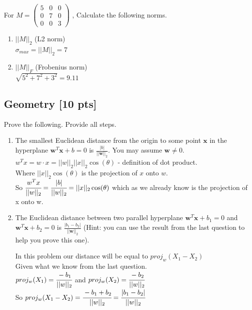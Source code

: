 \documentclass[a4paper]{article}
\theoremstyle{definition}
\newenvironment{soln}{
	\leavevmode\color{blue}\ignorespaces
}{}
\begin{document}
	For $M = \begin{pmatrix}
		5 & 0 & 0 \\ 0 & 7 & 0 \\ 0 & 0 & 3
		
	\end{pmatrix} $ , Calculate the following norms.
	\begin{enumerate}\addtocounter{enumi}{3}
		\item $||M||_{2}$ (L2 norm) \\
		\begin{soln}  $\sigma_{max} = ||M||_{2} = 7$ \end{soln}
		
		\item $||M||_{F}$ (Frobenius norm)\\
		\begin{soln}  $\sqrt{5^{2}+7^{2}+3^{2}}=9.11$ \end{soln}
		
		
	\end{enumerate}
	
	
	
	\subsection{Geometry [10 pts]}
	Prove the following.  Provide all steps.
	\begin{enumerate}
		\item 	The smallest Euclidean distance from the origin to some point $\mathbf{x}$ in the hyperplane $\mathbf{w}^{T}\mathbf{x} + b = 0$ is $\frac{|b|}{||\mathbf{w}||_2}$.  You may assume $\mathbf{w} \neq 0$.\\
		\begin{soln}  $w^{T}x = w \cdot x = ||w||_{2} ||x||_{2} \cos(\theta)$ - definition of dot product. \\
		Where $||x||_{2} \cos(\theta)$ is the projection of $x$ onto $w$. \\
		So $\cfrac{w^{T}x}{||w||_{2}} = \cfrac{|b|}{||w||_{2}} = ||x||_{2} \cos(\theta)$ which as we already know is the projection of x onto w.
		\end{soln}
		
		\item 	The Euclidean distance between two parallel hyperplane $\mathbf{w}^{T}\mathbf{x} + b_1 = 0$ and $\mathbf{w}^{T}\mathbf{x} + b_2 = 0$ is $\frac{|b_1 - b_2|}{||\mathbf{w}||_2}$ (Hint: you can use the result from the last question to help you prove this one).
		
		\begin{soln}  In this problem our distance will be equal to $proj_{w}(X_{1}-X_{2})$ \\
		Given what we know from the last question. \\
		$proj_{w}(X_{1}) = \cfrac{-b_{1}}{||w||_{2}}$ and $proj_{w}(X_{2}) = \cfrac{-b_{2}}{||w||_{2}}$ \\
		So $proj_{w}(X_{1}-X_{2}) = \cfrac{-b_{1}+b_{2}}{||w||_{2}} = \cfrac{|b_{1}-b_{2}|}{||w||_{2}}$
		\end{soln}
		
	\end{enumerate}
	
\end{document}
